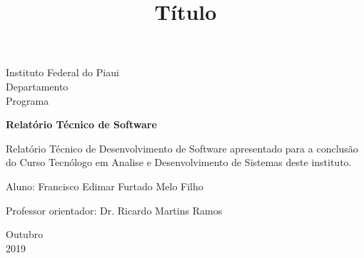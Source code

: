 \documentclass[a4paper, 12pt]{article}
\begin{document}
\begin{titlepage}
	\begin{center}
	

		\Huge{Instituto Federal do Piaui}\\
		\large{Departamento}\\ 
		\large{Programa}\\ 
\vspace{15pt}
        
        \vspace{85pt}
        
		\textbf{\LARGE{Relatório Técnico de Software}}
		\title{\large{Título}}
			
	\end{center}
\vspace{1,5cm}
	
	\begin{flushright}

   \begin{list}{}{
      \setlength{\leftmargin}{4.5cm}
      \setlength{\rightmargin}{0cm}
      \setlength{\labelwidth}{0pt}
      \setlength{\labelsep}{\leftmargin}}

      \item Relatório Técnico de Desenvolvimento de Software apresentado para a conclusão do Curso Tecnólogo em Analise e Desenvolvimento de Sistemas deste instituto.

      \begin{list}{}{
      \setlength{\leftmargin}{0cm}
      \setlength{\rightmargin}{0cm}
      \setlength{\labelwidth}{0pt}
      \setlength{\labelsep}{\leftmargin}}

			\item Aluno: Francisco Edimar Furtado Melo Filho
            \item Professor orientador: Dr. Ricardo Martins Ramos\

      \end{list}
   \end{list}
\end{flushright}
\vspace{1cm}
\begin{center}
		\vspace{\fill}
		 Outubro\\
		 2019
			\end{center}
\end{titlepage}
\end{document}
